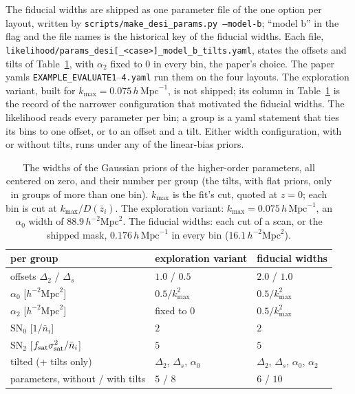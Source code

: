 \documentclass[11pt]{article}
\newcommand{\kmax}{k_{\mathrm{max}}}
\newcommand{\hMpc}{\,h\,\mathrm{Mpc}^{-1}}
\newcommand{\aunit}{\,h^{-2}\mathrm{Mpc}^2}
\newcommand{\SNz}{\mathrm{SN}_0}
\newcommand{\SNt}{\mathrm{SN}_2}
\begin{document}
The fiducial widths are shipped as one parameter file of the one
option per layout, written by
\texttt{scripts/make\_desi\_params.py --model-b}; ``model b'' in
the flag and the file names is the historical key of the fiducial
widths.  Each file,
\texttt{likelihood/\allowbreak params\_desi[\_<case>]\allowbreak\_model\_b\_tilts.yaml},
states the offsets and tilts of Table~\ref{tab:widths}, with
$\alpha_2$ fixed to $0$ in every bin, the paper's choice.  The paper
yamls \texttt{EXAMPLE\_EVALUATE1}--\texttt{4.yaml} run them on the
four layouts.  The exploration variant, built for
$\kmax = 0.075\hMpc$, is not shipped; its column in
Table~\ref{tab:widths} is the record of the narrower configuration
that motivated the fiducial widths.  The
likelihood reads every parameter per bin; a group is a yaml statement
that ties its bins to one offset, or to an offset and a tilt.
Either width configuration,
with or
without tilts, runs under any of the linear-bias priors.

\begin{table}[tbp]
\centering
\small
\begin{tabular}{lll}
\toprule
per group & exploration variant & fiducial widths \\
\midrule
offsets $\Delta_2$ / $\Delta_s$ & $1.0$ / $0.5$ & $2.0$ / $1.0$ \\
$\alpha_0$ [$h^{-2}\mathrm{Mpc}^2$] & $0.5/\kmax^2$ & $0.5/\kmax^2$ \\
$\alpha_2$ [$h^{-2}\mathrm{Mpc}^2$] & fixed to $0$ & $0.5/\kmax^2$ \\
$\SNz$ [$1/\bar{n}_i$] & $2$ & $2$ \\
$\SNt$ [$f_{\rm sat}\sigma_{\rm sat}^2/\bar{n}_i$] & $5$ & $5$ \\
tilted (+ tilts only) & $\Delta_2$, $\Delta_s$, $\alpha_0$
 & $\Delta_2$, $\Delta_s$, $\alpha_0$, $\alpha_2$ \\
parameters, without / with tilts & $5$ / $8$ & $6$ / $10$ \\
\bottomrule
\end{tabular}
\caption{The widths of the Gaussian priors of the higher-order
parameters, all centered on zero, and their number per group (the
tilts, with flat priors, only in groups of more than one bin).
$\kmax$ is the fit's cut, quoted at $z = 0$; each bin is cut at
$\kmax/D(\bar{z}_i)$.  The exploration variant:
$\kmax = 0.075\hMpc$, an $\alpha_0$
width of $88.9\aunit$.  The fiducial widths: each cut of a scan, or
the shipped
mask, $0.176\hMpc$ in every bin ($16.1\aunit$).}
\label{tab:widths}
\end{table}
\end{document}
